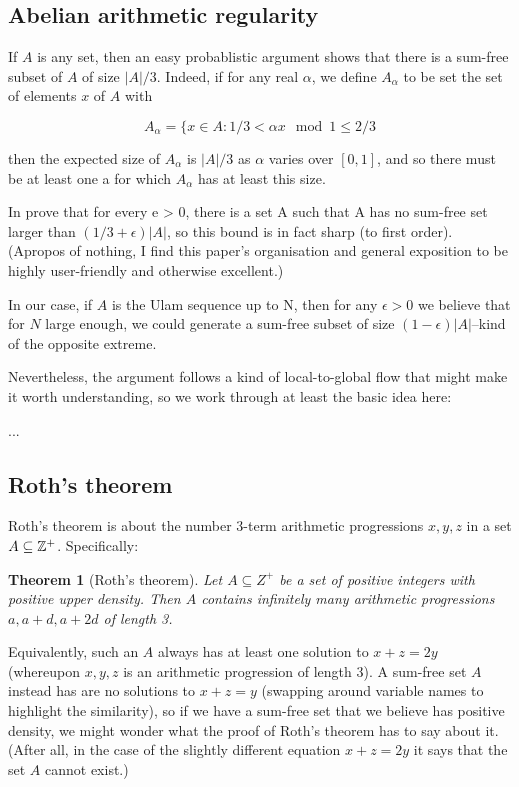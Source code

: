 \documentclass{article}
\newtheorem{theorem}{Theorem}[section]
\theoremstyle{definition}
\theoremstyle{remark}
\numberwithin{equation}{section}
\begin{document}
\subsection{Abelian arithmetic regularity}

If $A$ is any set, then an easy probablistic argument shows that there
is a sum-free subset of $A$ of size $|A|/3$.  Indeed, if for any real $\alpha$,
we define $A_\alpha$ to be set the set of elements $x$ of $A$ with

\[A_\alpha = \{x \in A : 1/3 < \alpha x \mod{1} \leq 2/3\]

then the expected size of $A_\alpha$ is $|A|/3$ as $\alpha$ varies
over $[0,1]$, and so there must be at least one a for which $A_\alpha$
has at least this size.

In \cite{no_large_sumfree_subset_eberhard} prove that for every e > 0, there is a set A such
that A has no sum-free set larger than $(1/3 + \epsilon)|A|$, so this
bound is in fact sharp (to first order).  (Apropos of nothing, I find
this paper's organisation and general exposition to be highly
user-friendly and otherwise excellent.)

In our case, if $A$ is the Ulam sequence up to N, then for any
$\epsilon > 0$ we believe that for $N$ large enough, we could generate
a sum-free subset of size $(1-\epsilon)|A|$--kind of the opposite
extreme.

Nevertheless, the argument follows a kind of local-to-global flow that
might make it worth understanding, so we work through at least the
basic idea here:

...

\subsection{Roth's theorem}

Roth's theorem is about the number 3-term arithmetic progressions
$x, y, z$ in a set $A \subseteq \mathbb{Z}^+$.  Specifically: 


\begin{theorem}[Roth's theorem]
  Let $A \subseteq Z^+$ be a set of positive integers with positive
  upper density.  Then $A$ contains infinitely many arithmetic
  progressions $a, a+d, a+2d$ of length 3.  
\end{theorem}

Equivalently, such an $A$ always has at least one solution to $x+z=2y$
(whereupon $x, y, z$ is an arithmetic progression of length $3$).  A
sum-free set $A$ instead has are no solutions to $x+z=y$ (swapping
around variable names to highlight the similarity), so if we have a
sum-free set that we believe has positive density, we might wonder
what the proof of Roth's theorem has to say about it.  (After all, in
the case of the slightly different equation $x+z=2y$ it says that the
set $A$ cannot exist.)
\end{document}
